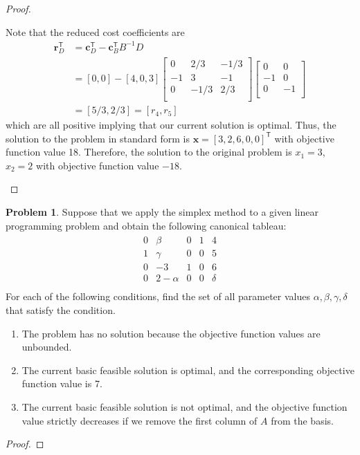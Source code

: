 \documentclass[12pt]{article}
\theoremstyle{definition}
\newtheorem{problem}{Problem}
\newcommand{\vect}[1]{\boldsymbol{#1}}
\newcommand{\tran}{\mathsf{T}}
\begin{document}
\begin{proof}
\begin{enumerate}
      Note that the reduced cost coefficients are
      \begin{align*}
        \vect{r}_D^\tran &= \vect{c}_D^\tran - \vect{c}_B^\tran B^{-1} D \\
        &= [0, 0] - [4, 0, 3]
        \begin{bmatrix}
          0 & 2/3 & -1/3\\
          -1 & 3 & -1\\
          0 & -1/3 & 2/3\\
        \end{bmatrix}
        \begin{bmatrix}
          0 & 0 \\
          -1 & 0 \\
          0 & -1 \\
        \end{bmatrix} \\
        &= [5/3, 2/3] = [r_4,r_5]
      \end{align*}
      which are all positive implying that our current solution is optimal.
      Thus, the solution to the problem in standard form is $\vect{x} = [3,2,6,0,0]^\tran$
      with objective function value 18. Therefore, the solution to the original problem
      is $x_1 = 3$, $x_2 = 2$ with objective function value $-18$.

  \end{enumerate}
\end{proof}
\newpage

\begin{problem}
  Suppose that we apply the simplex method to a given linear programming
  problem and obtain the following canonical tableau:
  \begin{align*}
    \begin{matrix}
      0 & \beta & 0 & 1 & 4 \\
      1 & \gamma & 0 & 0 & 5 \\
      0 & -3 & 1 & 0 & 6 \\
      0 & 2 - \alpha & 0 & 0 & \delta \\
    \end{matrix}
  \end{align*}
  For each of the following conditions, find the set of all parameter values
  $\alpha, \beta, \gamma, \delta$ that satisfy the condition.
  \begin{enumerate}
    \item The problem has no solution because the objective function values are
      unbounded.
    \item The current basic feasible solution is optimal, and the corresponding
      objective function value is 7.
    \item The current basic feasible solution is not optimal, and the objective
      function value strictly decreases if we remove the first column of $A$ from
      the basis.
  \end{enumerate}
\end{problem}

\begin{proof}
\end{proof}
\end{document}
